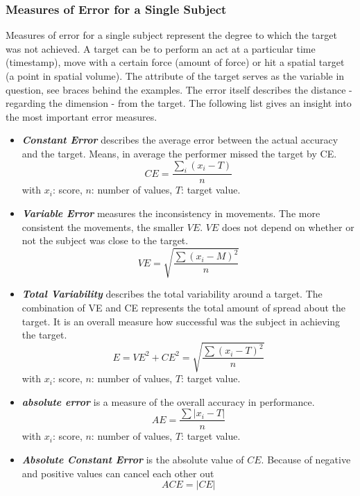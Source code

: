 \subsubsection{Measures of Error for a Single Subject}
Measures of error for a single subject represent the degree to which the target was not achieved. A target can be to perform an act at a particular time (timestamp), move with a certain force (amount of force) or hit a spatial target (a point in spatial volume). The attribute of the target serves as the variable in question, see braces behind the examples. The error itself describes the distance - regarding the dimension - from the target. The following list gives an insight into the most important error measures.
\begin{itemize}
	\item \textbf{\textit{Constant Error}} describes the average error between the actual accuracy and the target. Means, in average the performer missed the target by CE.
	\begin{equation}
	CE=\frac{\sum_i(x_i-T)}{n}
	\end{equation}
	\label{eq:constanterror}
	with $x_i$: score, $n$: number of values, $T$: target value.
	\item \textbf{\textit{Variable Error}} measures the inconsistency in movements. The more consistent the movements, the smaller $VE$. $VE$ does not depend on whether or not the subject was close to the target.
	\begin{equation}
	VE=\sqrt{\frac{\sum(x_i-M)^2}{n}}    
	\end{equation}
	\item \textbf{\textit{Total Variability}} describes the total variability around a target. The combination of VE and CE represents the total amount of spread about the target. It is an overall measure how successful was the subject in achieving the target.
	\begin{equation}
	E=VE^2+CE^2=\sqrt{\frac{\sum(x_i-T)^2}{n}}
	\end{equation}
	with $x_i$: score, $n$: number of values, $T$: target value.
	\item \textbf{\textit{absolute error}} is a measure of the overall accuracy in performance.
	\begin{equation}
	AE=\frac{\sum|x_i-T|}{n}
	\end{equation}
	with $x_i$: score, $n$: number of values, $T$: target value.
	\item \textbf{\textit{Absolute Constant Error}} is the absolute value of $CE$. Because of negative and positive values can cancel each other out
	\begin{equation}
	ACE = |CE|
	\end{equation}
\end{itemize}



